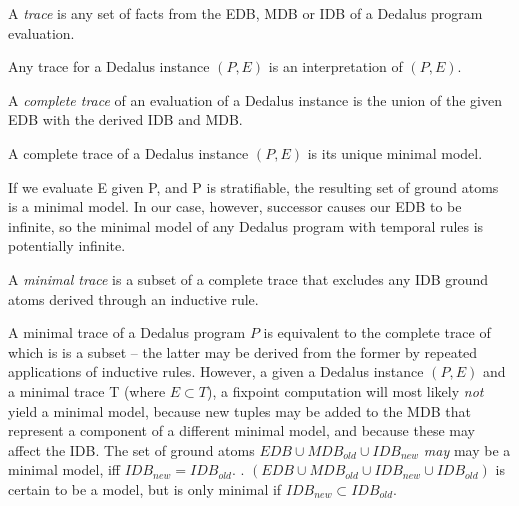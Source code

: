 \begin{definition}
A \emph{trace} is any set of facts from the EDB, MDB or IDB of a Dedalus program evaluation.
\end{definition}

Any trace for a Dedalus instance $(P,E)$ is an interpretation of $(P,E)$.

\begin{definition}
%
A \emph{complete trace} of an evaluation of a Dedalus instance is the union of
the given EDB with the derived IDB and MDB.
%
\end{definition}

\begin{lemma}
%
A complete trace of a Dedalus instance $(P,E)$ is its unique minimal model.
%
\end{lemma}


If we evaluate E given P, and P is stratifiable, the resulting set of ground atoms is a minimal model.
In our case, however, successor causes our EDB to be infinite, so the minimal model of any Dedalus program 
with temporal rules is potentially infinite.  


\begin{definition}
A \emph{minimal trace} is a subset of a complete trace that excludes any IDB ground atoms derived through an inductive
rule.
\end{definition}

A minimal trace of a Dedalus program $P$ is equivalent to the complete trace of which is is a subset -- the latter may be derived from the former by repeated
applications of inductive rules.  However, a given a Dedalus instance $(P, E)$ and a minimal trace T (where $E \subset T$), a fixpoint
computation will most likely \emph{not} yield a minimal model, because new tuples may be added to the MDB that represent a component 
of a different minimal model, and because these may affect the IDB.  The set of ground atoms $EDB \cup MDB_{old} \cup IDB_{new}$
\emph{may} may be a minimal model, iff $IDB_{new} = IDB_{old}$.  .  
$(EDB \cup MDB_{old} \cup IDB_{new} \cup IDB_{old})$ is certain to be a model, but is only minimal if $IDB_{new} \subset IDB_{old}$.

